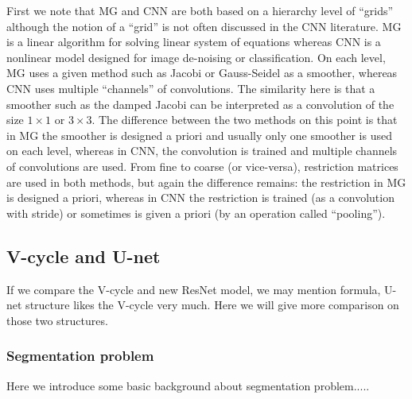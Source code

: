First we note that MG and CNN are both based on a hierarchy level of
``grids'' although the notion of a ``grid'' is not often discussed in
the CNN literature.   MG is a linear algorithm for solving linear system of equations
whereas CNN is a  nonlinear model designed for image de-noising or
classification.  On each level, MG uses a given method such as Jacobi or
Gauss-Seidel as a smoother, whereas CNN uses multiple ``channels'' of
convolutions.    The similarity here is that a smoother such as the damped
Jacobi can be interpreted as a convolution of the size $1\times 1$ or
$3\times 3$.  The difference between the two methods on this point is
that in MG the smoother is designed a priori
and usually only one smoother is used on each level, whereas in CNN,
the convolution is trained and multiple channels of convolutions are
used.   From fine to coarse (or vice-versa), restriction  matrices are used in both
methods, but again the difference remains: the restriction in MG is
designed a priori,  whereas in CNN the restriction is trained (as a
convolution with stride) or sometimes is given a priori (by an
operation called ``pooling'').

\subsection{V-cycle and U-net}
If we compare the V-cycle and new ResNet model, we may mention formula, 
U-net \cite{ronneberger2015u} structure likes the V-cycle very much. Here we will give more comparison on those two structures. 
\subsubsection{Segmentation problem}
Here we introduce some basic background about segmentation problem.....

